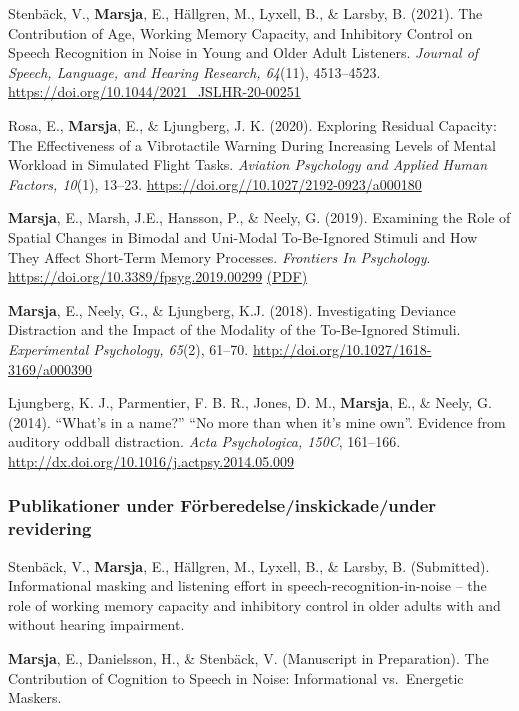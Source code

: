 \documentclass[]{article}
\begin{document}
Stenbäck, V., \textbf{Marsja}, E., Hällgren, M., Lyxell, B., \& Larsby,
B. (2021). The Contribution of Age, Working Memory Capacity, and
Inhibitory Control on Speech Recognition in Noise in Young and Older
Adult Listeners. \emph{Journal of Speech, Language, and Hearing
Research, 64}(11), 4513--4523.
\url{https://doi.org/10.1044/2021_JSLHR-20-00251}

Rosa, E., \textbf{Marsja}, E., \& Ljungberg, J. K. (2020). Exploring
Residual Capacity: The Effectiveness of a Vibrotactile Warning During
Increasing Levels of Mental Workload in Simulated Flight Tasks.
\emph{Aviation Psychology and Applied Human Factors, 10}(1), 13--23.
\url{https://doi.org//10.1027/2192-0923/a000180}

\textbf{Marsja}, E., Marsh, J.E., Hansson, P., \& Neely, G. (2019).
Examining the Role of Spatial Changes in Bimodal and Uni-Modal
To-Be-Ignored Stimuli and How They Affect Short-Term Memory Processes.
\emph{Frontiers In Psychology}.
\url{https://doi.org/10.3389/fpsyg.2019.00299}
\href{https://bit.ly/3LkKD19}{(PDF)}

\textbf{Marsja}, E., Neely, G., \& Ljungberg, K.J. (2018). Investigating
Deviance Distraction and the Impact of the Modality of the To-Be-Ignored
Stimuli. \emph{Experimental Psychology, 65}(2), 61--70.
\url{http://doi.org/10.1027/1618-3169/a000390}

Ljungberg, K. J., Parmentier, F. B. R., Jones, D. M., \textbf{Marsja},
E., \& Neely, G. (2014). ``What's in a name?'' ``No more than when it's
mine own''. Evidence from auditory oddball distraction. \emph{Acta
Psychologica, 150C}, 161--166.
\href{http://doi.org/10.1027/1618-3169/a000390}{http://dx.doi.org/10.1016/j.actpsy.2014.05.009}

\hypertarget{publikationer-under-fuxf6rberedelseinskickadeunder-revidering}{%
\subsubsection{Publikationer under Förberedelse/inskickade/under
revidering}\label{publikationer-under-fuxf6rberedelseinskickadeunder-revidering}}

Stenbäck, V., \textbf{Marsja}, E., Hällgren, M., Lyxell, B., \& Larsby,
B. (Submitted). Informational masking and listening effort in
speech-recognition-in-noise -- the role of working memory capacity and
inhibitory control in older adults with and without hearing impairment.

\textbf{Marsja}, E., Danielsson, H., \& Stenbäck, V. (Manuscript in
Preparation). The Contribution of Cognition to Speech in Noise:
Informational vs.~Energetic Maskers.
\end{document}
